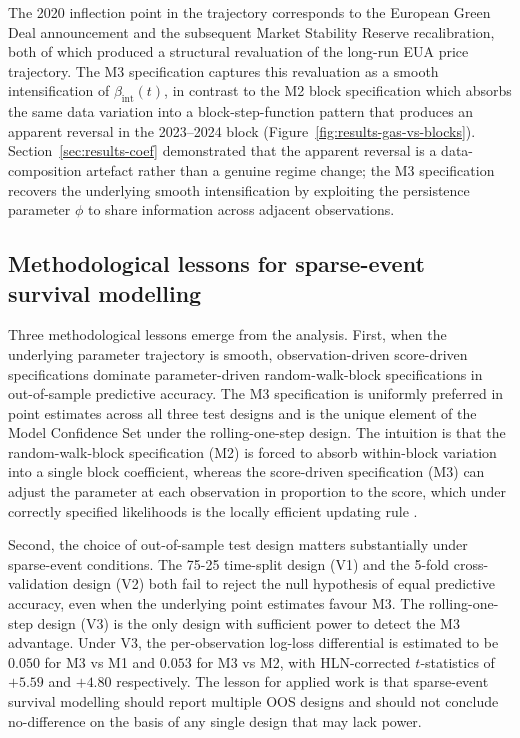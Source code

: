 \documentclass[12pt,a4paper]{article}
\newcommand{\bint}{\beta_{\text{int}}}
\theoremstyle{plain}
\theoremstyle{definition}
\begin{document}
The 2020 inflection point in the trajectory corresponds to the European Green Deal announcement and the subsequent Market Stability Reserve recalibration, both of which produced a structural revaluation of the long-run EUA price trajectory. The M3 specification captures this revaluation as a smooth intensification of $\bint(t)$, in contrast to the M2 block specification which absorbs the same data variation into a block-step-function pattern that produces an apparent reversal in the 2023--2024 block (Figure~\ref{fig:results-gas-vs-blocks}). Section~\ref{sec:results-coef} demonstrated that the apparent reversal is a data-composition artefact rather than a genuine regime change; the M3 specification recovers the underlying smooth intensification by exploiting the persistence parameter $\phi$ to share information across adjacent observations.

\subsection{Methodological lessons for sparse-event survival modelling}

Three methodological lessons emerge from the analysis. First, when the underlying parameter trajectory is smooth, observation-driven score-driven specifications dominate parameter-driven random-walk-block specifications in out-of-sample predictive accuracy. The M3 specification is uniformly preferred in point estimates across all three test designs and is the unique element of the Model Confidence Set under the rolling-one-step design. The intuition is that the random-walk-block specification (M2) is forced to absorb within-block variation into a single block coefficient, whereas the score-driven specification (M3) can adjust the parameter at each observation in proportion to the score, which under correctly specified likelihoods is the locally efficient updating rule \citep{blasques2015robust}.

Second, the choice of out-of-sample test design matters substantially under sparse-event conditions. The 75-25 time-split design (V1) and the 5-fold cross-validation design (V2) both fail to reject the null hypothesis of equal predictive accuracy, even when the underlying point estimates favour M3. The rolling-one-step design (V3) is the only design with sufficient power to detect the M3 advantage. Under V3, the per-observation log-loss differential is estimated to be $0.050$ for M3 vs M1 and $0.053$ for M3 vs M2, with HLN-corrected $t$-statistics of $+5.59$ and $+4.80$ respectively. The lesson for applied work is that sparse-event survival modelling should report multiple OOS designs and should not conclude no-difference on the basis of any single design that may lack power.
\end{document}
